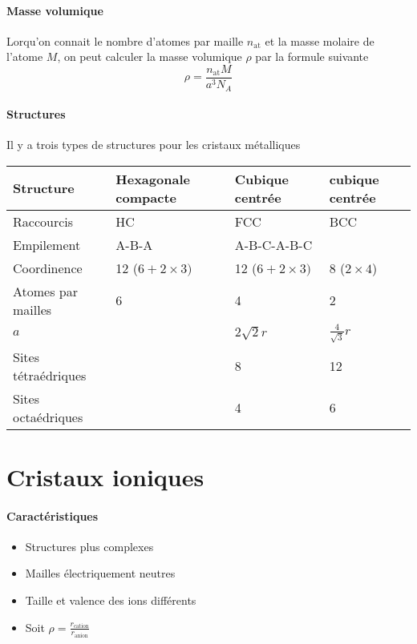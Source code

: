 \paragraph{Masse volumique}
Lorqu'on connait le nombre d'atomes par maille $n_{\mathrm{at}}$ et la masse molaire de l'atome $M$,
on peut calculer la masse volumique $\rho$ par la formule suivante
\[ \rho = \frac{n_{\mathrm{at}}M}{a^3N_A} \]

\paragraph{Structures}
Il y a trois types de structures pour les cristaux métalliques
\begin{center}
  \begin{tabular}{|p{2cm}|l|l|l|}
    \hline
    Structure & Hexagonale compacte & Cubique centrée & cubique centrée\\
    \hline
    Raccourcis & HC & FCC & BCC\\
    \hline
    Empilement & A-B-A & A-B-C-A-B-C\\
    \hline
    Coordinence & 12 ($6 + 2\times3)$ & 12 ($6 + 2\times3)$ & 8 ($2 \times 4$)\\
    \hline
    Atomes par mailles & 6 & 4 & 2\\
    \hline
    $a$ & & $2\sqrt{2}r$ & $\frac{4}{\sqrt{3}}r$\\
    \hline
    Sites tétraédriques & & 8 & 12\\
    \hline
    Sites octaédriques & & 4 & 6\\
    \hline
  \end{tabular}
\end{center}

\section{Cristaux ioniques}

\paragraph{Caractéristiques}
\begin{itemize}
  \item Structures plus complexes
  \item Mailles électriquement neutres
  \item Taille et valence des ions différents
  \item Soit $\rho = \frac{r_\mathrm{cation}}{r_\mathrm{anion}}$
\end{itemize}

